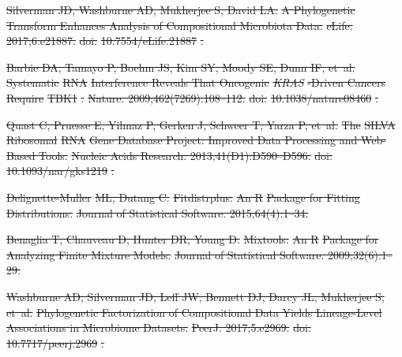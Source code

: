\documentclass[10pt,letterpaper]{article}
\providecommand{\DIFdeltex}[1]{{\protect\color{red}\sout{#1}}}                      %
\providecommand{\DIFdel}[1]{\texorpdfstring{\DIFdeltex{#1}}{}} %
\begin{document}
\DIFdel{Silverman JD, Washburne AD, Mukherjee S, David LA.
}%
\DIFdel{A Phylogenetic Transform Enhances Analysis of Compositional
  Microbiota Data.
}%
\DIFdel{eLife. 2017;6:e21887.
}%
\DIFdel{doi:}%
\DIFdel{10.7554/eLife.21887}%
\DIFdel{.
}%

\DIFdel{Barbie DA, Tamayo P, Boehm JS, Kim SY, Moody SE, Dunn IF, et~al.
}%
\DIFdel{Systematic }%
\DIFdel{RNA}%
\DIFdel{Interference Reveals That Oncogenic
  }%
\emph{\DIFdel{KRAS}}%
\DIFdel{-Driven Cancers Require }%
\DIFdel{TBK1}%
\DIFdel{.
}%
\DIFdel{Nature. 2009;462(7269):108--112.
}%
\DIFdel{doi:}%
\DIFdel{10.1038/nature08460}%
\DIFdel{.
}%

\DIFdel{Quast C, Pruesse E, Yilmaz P, Gerken J, Schweer T, Yarza P, et~al.
}%
\DIFdel{The }%
\DIFdel{SILVA}%
\DIFdel{Ribosomal }%
\DIFdel{RNA}%
\DIFdel{Gene Database Project: Improved Data
  Processing and Web-Based Tools.
}%
\DIFdel{Nucleic Acids Research. 2013;41(D1):D590--D596.
}%
\DIFdel{doi:}%
\DIFdel{10.1093/nar/gks1219}%
\DIFdel{.
}%

\DIFdel{Delignette-Muller}%
\DIFdel{ML, Dutang C.
}%
\DIFdel{Fitdistrplus: }%
\DIFdel{An R}%
\DIFdel{Package for Fitting Distributions.
}%
\DIFdel{Journal of Statistical Software. 2015;64(4):1--34.
}%

\DIFdel{Benaglia T, Chauveau D, Hunter DR, Young D.
}%
\DIFdel{Mixtools: }%
\DIFdel{An R}%
\DIFdel{Package for Analyzing Finite Mixture Models.
}%
\DIFdel{Journal of Statistical Software. 2009;32(6):1--29.
}%

\DIFdel{Washburne AD, Silverman JD, Leff JW, Bennett DJ, Darcy JL, Mukherjee S, et~al.
}%
\DIFdel{Phylogenetic Factorization of Compositional Data Yields Lineage-Level
  Associations in Microbiome Datasets.
}%
\DIFdel{PeerJ. 2017;5:e2969.
}%
\DIFdel{doi:}%
\DIFdel{10.7717/peerj.2969}%
\DIFdel{.
}%
\end{document}
